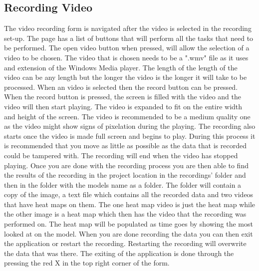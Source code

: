 \subsection{Recording Video}
The video recording form is navigated after the video is selected in the recording set-up. The page has a list of buttons that will perform all the tasks that need to be performed. The open video button when pressed, will allow the selection of a video to be chosen. The video that is chosen needs to be a ".wmv" file as it uses and extension of the Windows Media player. The length of the length of the video can be any length but the longer the video is the longer it will take to be processed. When an video is selected then the record button can be pressed. When the record button is pressed, the screen is filled with the video and the video will then start playing. The video is expanded to fit on the entire width and height of the screen. The video is recommended to be a medium quality one as the video might show signs of pixelation during the playing. The recording also starts once the video is made full screen and begins to play. During this process it is recommended that you move as little as possible as the data that is recorded could be tampered with. The recording will end when the video has stopped playing. Once you are done with the recording process you are then able to find the results of the recording in the project location in the recordings' folder and then in the folder with the models name as a folder. The folder will contain a copy of the image, a text file which contains all the recorded data and two videos that have heat maps on them. The one heat map video is just the heat map while the other image is a heat map which then has the video that the recording was performed on. The heat map will be populated as time goes by showing the most looked at on the model. When you are done recording the data you can then exit the application or restart the recording. Restarting the recording will overwrite the data  that was there. The exiting of the application is done through the pressing the red X in the top right corner of the form.

